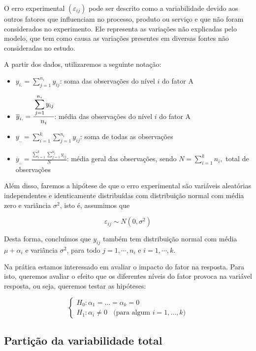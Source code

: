 \documentclass[
]{book}
\providecommand{\tightlist}{%
  \setlength{\itemsep}{0pt}\setlength{\parskip}{0pt}}
\begin{document}
O erro experimental \((\varepsilon_{ij})\) pode ser descrito como a variabilidade devido aos outros fatores que influenciam no processo, produto ou serviço e que não foram considerados no experimento. Ele representa as variações não explicadas pelo modelo, que tem como causa as variações presentes em diversas fontes não consideradas no estudo.

A partir dos dados, utilizaremos a seguinte notação:

\begin{itemize}
\tightlist
\item
  \(y_{i.}=\displaystyle \sum_{j=1}^{n_{i}} y_{ij}\): soma das observações do nível \(i\) do fator A
\item
  \(\overline{y}_{i.}=\cfrac{\displaystyle\sum_{j=1}^{n_{i}} y_{ij}}{\displaystyle n_{i}}\): média das observações do nível \(i\) do fator A
\item
  \(y_{..}=\displaystyle\sum_{i=1}^{k} \sum_{j=1}^{n_{i}}y_{ij}\): soma de todas as observações
\item
  \(\overline{y}_{..}=\frac{\displaystyle \sum_{i=1}^{k}\sum_{j=1}^{n_{i}} y_{ij}}{\displaystyle N}\): média geral das observações, sendo \(N=\displaystyle\sum^{k}_{i=1}n_{i},\) total de observações
\end{itemize}

Além disso, faremos a hipótese de que o erro experimental são variáveis aleatórias independentes e identicamente distribuídas com distribuição normal com média zero e variância \(\sigma^2\), isto é, assumimos que

\[\varepsilon_{ij} \sim N(0, \sigma^2)\]

Desta forma, concluímos que \(y_{ij}\) também tem distribuição normal com média \(\mu + \alpha_i\) e variância \(\sigma^2\), para todo \(j=1, \cdots, n_i\) e \(i=1, \cdots, k\).

Na prática estamos interessado em avaliar o impacto do fator na resposta. Para isto, queremos avaliar o efeito que os diferentes níveis do fator provoca na variável resposta, ou seja, queremos testar as hipóteses:

\[
\begin{cases} 
H_0: \alpha_1=\ldots=\alpha_k=0 \\
H_1:\alpha_i\neq 0~~~~\text{(para algum }i=1,\ldots,k\text{)}
\end{cases}
\]

\hypertarget{partiuxe7uxe3o-da-variabilidade-total}{%
\subsection{Partição da variabilidade total}\label{partiuxe7uxe3o-da-variabilidade-total}}
\end{document}
